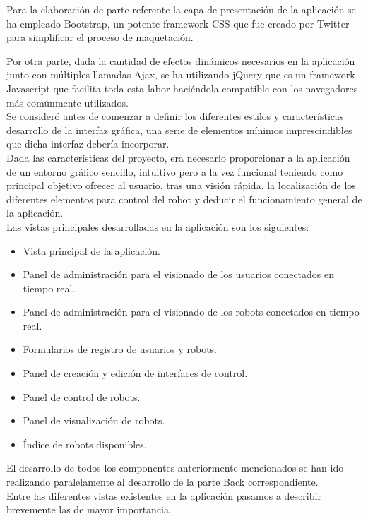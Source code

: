 \documentclass[a4paper,12pt]{article}
\begin{document}
Para la elaboración de parte referente la capa de presentación de la aplicación se ha 
empleado Bootstrap, un potente framework CSS que fue creado por Twitter para simplificar el proceso de maquetación. 

Por otra parte, dada la cantidad de efectos dinámicos necesarios en la aplicación junto con múltiples llamadas Ajax, se ha utilizando jQuery que es un framework Javascript que facilita toda esta
labor haciéndola compatible con los navegadores más comúnmente utilizados.\\

Se consideró antes de comenzar a definir los diferentes estilos y características desarrollo de la interfaz gráfica, una serie de elementos mínimos imprescindibles que dicha interfaz debería incorporar.\\

Dada las características del proyecto, era necesario proporcionar a la aplicación de un entorno gráfico sencillo, intuitivo pero a la vez funcional teniendo como principal objetivo ofrecer al usuario, tras 
una visión rápida, la localización de los diferentes elementos para control del robot y deducir el funcionamiento general de la aplicación.\\

Las vistas principales desarrolladas en la aplicación son los siguientes:

\begin{itemize}
 \item Vista principal de la aplicación.
 \item Panel de administración para el visionado de los usuarios conectados en tiempo real.
 \item Panel de administración para el visionado de los robots conectados en tiempo real.
 \item Formularios de registro de usuarios y robots.
 \item Panel de creación y edición de interfaces de control.
 \item Panel de control de robots.
 \item Panel de visualización de robots.
 \item Índice de robots disponibles.
\end{itemize}

El desarrollo de todos los componentes anteriormente mencionados se han ido realizando paralelamente al desarrollo de la parte Back correspondiente.\\

Entre las diferentes vistas existentes en la aplicación pasamos a describir brevemente las de mayor importancia.
\end{document}
